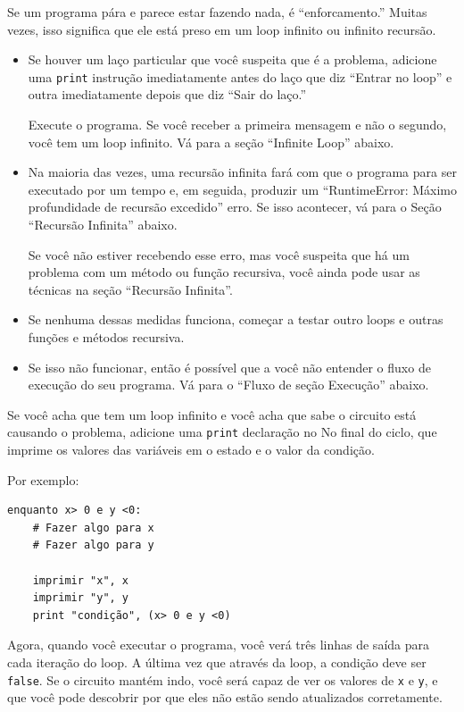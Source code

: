 \documentclass[10pt]{book}
\begin{document}
\begin{exercise}
\begin{v erbatim}
Se um programa pára e parece estar fazendo nada, é ``enforcamento.''
Muitas vezes, isso significa que ele está preso em um loop infinito ou infinito
recursão.

\begin{itemize}

\item Se houver um laço particular que você suspeita que é a
problema, adicione uma {\tt print} instrução imediatamente antes do laço que diz
``Entrar no loop'' e outra imediatamente depois que diz
``Sair do laço.''

Execute o programa. Se você receber a primeira mensagem e não o segundo,
você tem um loop infinito. Vá para a seção ``Infinite Loop''
abaixo.

\item Na maioria das vezes, uma recursão infinita fará com que o programa
para ser executado por um tempo e, em seguida, produzir um ``RuntimeError: Máximo
profundidade de recursão excedido'' erro. Se isso acontecer, vá para o
Seção ``Recursão Infinita'' abaixo.

Se você não estiver recebendo esse erro, mas você suspeita que há um problema
com um método ou função recursiva, você ainda pode usar as técnicas
na seção ``Recursão Infinita''.

\item Se nenhuma dessas medidas funciona, começar a testar outro
loops e outras funções e métodos recursiva.

\item Se isso não funcionar, então é possível que a
você não entender o fluxo de execução do seu programa.
Vá para o ``Fluxo de seção Execução'' abaixo.

\end{itemize}



Se você acha que tem um loop infinito e você acha que sabe
o circuito está causando o problema, adicione uma {\tt print} declaração no
No final do ciclo, que imprime os valores das variáveis ​​em
o estado e o valor da condição.

Por exemplo:

\begin{verbatim}
enquanto x> 0 e y <0:
    # Fazer algo para x
    # Fazer algo para y

    imprimir "x", x
    imprimir "y", y
    print "condição", (x> 0 e y <0)
\end{verbatim}
%
Agora, quando você executar o programa, você verá três linhas de saída
para cada iteração do loop. A última vez que através da
loop, a condição deve ser {\tt false}. Se o circuito mantém
indo, você será capaz de ver os valores de {\tt x} e {\tt y},
e que você pode descobrir por que eles não estão sendo atualizados corretamente.



\end{v erbatim}
\end{exercise}
\end{document}
